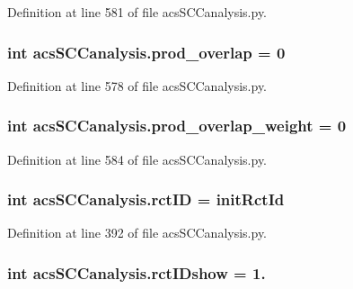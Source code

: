 Definition at line 581 of file acs\+S\+C\+Canalysis.\+py.

\hypertarget{a00130_a213e964195f0666d00663ca874a09caa}{
\subsubsection[{prod\+\_\+overlap}]{\setlength{\rightskip}{0pt plus 5cm}int acs\+S\+C\+Canalysis.\+prod\+\_\+overlap = 0}}\label{a00130_a213e964195f0666d00663ca874a09caa}


Definition at line 578 of file acs\+S\+C\+Canalysis.\+py.

\hypertarget{a00130_ab78b07d6cd1a94356c4fee43dfc1272a}{
\subsubsection[{prod\+\_\+overlap\+\_\+weight}]{\setlength{\rightskip}{0pt plus 5cm}int acs\+S\+C\+Canalysis.\+prod\+\_\+overlap\+\_\+weight = 0}}\label{a00130_ab78b07d6cd1a94356c4fee43dfc1272a}


Definition at line 584 of file acs\+S\+C\+Canalysis.\+py.

\hypertarget{a00130_a78ffc7d3b69c53ec5389a151e7fdcb83}{
\subsubsection[{rct\+I\+D}]{\setlength{\rightskip}{0pt plus 5cm}int acs\+S\+C\+Canalysis.\+rct\+I\+D = {\bf init\+Rct\+Id}}}\label{a00130_a78ffc7d3b69c53ec5389a151e7fdcb83}


Definition at line 392 of file acs\+S\+C\+Canalysis.\+py.

\hypertarget{a00130_a8a780c7762bc8a40f296abfd474b7ce4}{
\subsubsection[{rct\+I\+Dshow}]{\setlength{\rightskip}{0pt plus 5cm}int acs\+S\+C\+Canalysis.\+rct\+I\+Dshow = 1.}}\label{a00130_a8a780c7762bc8a40f296abfd474b7ce4}


